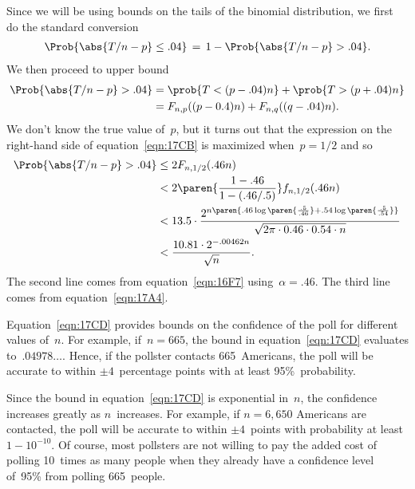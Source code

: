 \begin{editingnotes}
Since we will be using bounds on the tails of the binomial
distribution, we first do the standard conversion
\begin{equation*}
\Prob{\strut\abs{T/n - p} \le .04}
    \,=\, 1 - \Prob{\strut \abs{T/n - p} > .04}.
\end{equation*}
We then proceed to upper bound
\begin{align}
\Prob{\abs{T/n - p} > .04}
    & = \prob{T < (p - .04) n} + \prob{T > (p + .04) n} \notag\\
    &= F_{n, p}((p - 0.4)n) + F_{n, q}((q - .04) n).
        \label{eqn:17CB}
\end{align}
We don't know the true value of~$p$, but it turns out that the
expression on the right-hand side of equation~\eqref{eqn:17CB} is
maximized when~$p = 1/2$ and so
\begingroup
\openup\jot
\begin{align}
\Prob{\strut \abs{T/n - p} > .04}
    &\le 2 F_{n, 1/2}(.46n) \notag\\
    &<   2 \paren{\frac{1 - .46}{1 - (.46/.5)}} f_{n, 1/2}(.46n)
        \notag\\
    &< 13.5 \cdot 
        \frac{ 2^{n \paren{.46 \log\paren{\frac{.5}{.46}}
                         + .54 \log\paren{\frac{.5}{.54}} } } }
             {\sqrt{2\pi \cdot 0.46 \cdot 0.54 \cdot n}} \notag\\
    & < \frac{ 10.81 \cdot 2^{-.00462 n} }{ \sqrt{n} }.
        \label{eqn:17CD}
\end{align}
\endgroup
The second line comes from equation~\eqref{eqn:16F7} using~$\alpha =
.46$.  The third line comes from equation~\eqref{eqn:17A4}.

Equation~\eqref{eqn:17CD} provides bounds on the confidence of the poll
for different values of~$n$.  For example, if~$n = 665$, the bound in
equation~\eqref{eqn:17CD} evaluates to~$.04978\dots$.  Hence, if the
pollster contacts 665~Americans, the poll will be accurate to within
$\pm 4$~percentage points with at least 95\%~probability.

Since the bound in equation~\eqref{eqn:17CD} is exponential in~$n$, the
confidence increases greatly as $n$~increases.  For example, if $n =
6{,}650$ Americans are contacted, the poll will be accurate to within
$\pm 4$~points with probability at least~$1 - 10^{-10}$.  Of
course, most pollsters are not willing to pay the added cost of
polling 10~times as many people when they already have a confidence
level of~95\% from polling 665~people.

\end{editingnotes}

